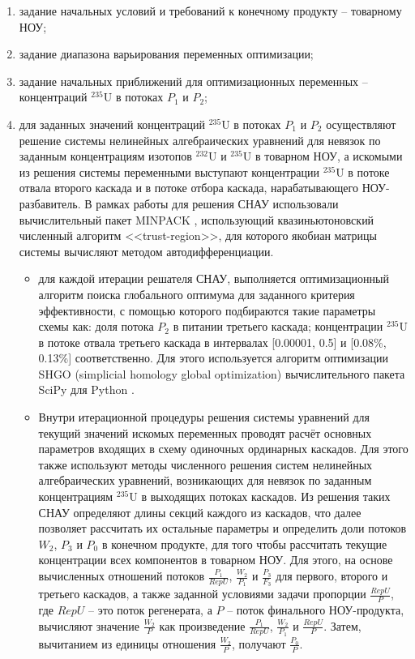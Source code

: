 \begin{enumerate}
    \item задание начальных условий и требований к конечному продукту -- товарному НОУ;
    \item задание диапазона варьирования переменных оптимизации;    
    \item задание начальных приближений для оптимизационных переменных -- концентраций $^{235}$U в потоках $P_1$ и $P_2$;
    \item для заданных значений концентраций $^{235}$U в потоках $P_1$ и $P_2$ осуществляют решение системы нелинейных алгебраических уравнений для невязок по заданным концентрациям изотопов $^{232}$U и $^{235}$U в товарном НОУ, а искомыми из решения системы переменными выступают концентрации $^{235}$U в потоке отвала второго каскада и в потоке отбора каскада, нарабатывающего НОУ-разбавитель. В рамках работы для решения СНАУ использовали вычислительный пакет MINPACK \cite{moreMINPACK}, использующий квазиньютоновский численный алгоритм <<trust-region>>, для которого якобиан матрицы системы вычисляют методом автодифференциации.
        \begin{itemize}
        \item для каждой итерации решателя СНАУ, выполняется оптимизационный алгоритм поиска глобального оптимума для заданного критерия эффективности, с помощью которого подбираются такие параметры схемы как: доля потока $P_2$ в питании третьего каскада; концентрации $^{235}$U в потоке отвала третьего каскада в интервалах [0.00001, 0.5] и [0.08\%, 0.13\%] соответственно. Для этого используется алгоритм оптимизации SHGO (simplicial homology global optimization) вычислительного пакета SciPy для Python  \cite{virtanenSciPyFundamentalAlgorithms2020a}.
        
        \item Внутри итерационной процедуры решения системы уравнений для текущий значений искомых переменных проводят расчёт основных параметров входящих в схему одиночных ординарных каскадов. Для этого также используют методы численного решения систем нелинейных алгебраических уравнений, возникающих для невязок по заданным концентрациям $^{235}$U в выходящих потоках каскадов. Из решения таких СНАУ определяют длины секций каждого из каскадов, что далее позволяет рассчитать их остальные параметры и определить доли потоков $W_2$, $P_3$  и $P_0$ в конечном продукте, для того чтобы рассчитать текущие концентрации всех компонентов в товарном НОУ. Для этого, на основе вычисленных отношений потоков $\frac{P_{1}}{RepU}$, $\frac{W_{2}}{P_{1}}$ и $\frac{P_{3}}{F_{3}}$ для первого, второго и третьего каскадов, а также заданной условиями задачи пропорции $\frac{RepU}{P}$, где $RepU$ -- это поток регенерата, а $P$ -- поток финального НОУ-продукта, вычисляют значение $\frac{W_{2}}{P}$ как произведение $\frac{P_{1}}{RepU}$, $\frac{W_{2}}{P_{1}}$ и $\frac{RepU}{P}$. Затем, вычитанием из единицы отношения $\frac{W_{2}}{P}$, получают $\frac{P_{0}}{P}$.
        

\end{itemize}
\end{enumerate}
